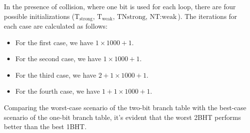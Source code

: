 In the presence of collision, where one bit is used for each loop, there are four possible initializations ($\text{T}_{\text{strong}}$, $\text{T}_{\text{weak}}$, $\text{TN}{\text{strong}}$, $\text{NT}:{\text{weak}}$). 
The iterations for each case are calculated as follows:
\begin{itemize}
    \item For the first case, we have $1 \times 1000 + 1$.
    \item For the second case, we have $1 \times 1000 + 1$.
    \item For the third case, we have $2 + 1 \times 1000 + 1$.
    \item For the fourth case, we have $1 + 1 \times 1000 + 1$.
\end{itemize}

Comparing the worst-case scenario of the two-bit branch table with the best-case scenario of the one-bit branch table, it's evident that the worst 2BHT performs better than the best 1BHT.\@